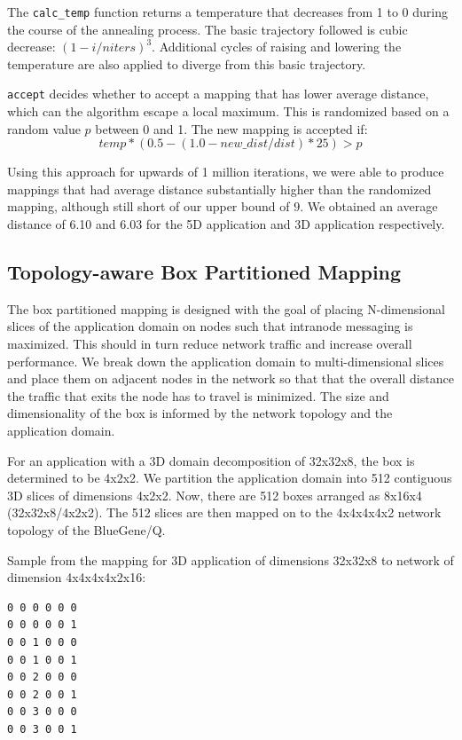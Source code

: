 \documentclass{acm_proc_article-sp}
\begin{document}
The \texttt{calc\_temp} function returns a temperature that
decreases from 1 to 0 during the course of the annealing process.
The basic trajectory followed is cubic decrease: $(1 - i/niters)^3$.
Additional cycles of raising and lowering the temperature are also
applied to diverge from this basic trajectory.

\texttt{accept} decides whether to accept a mapping that has lower
average distance, which can the algorithm escape a local maximum.
This is randomized based on a random value $p$ between 0 and 1.
The new mapping is accepted if:
$$temp * (0.5 - (1.0 - new\_dist/dist) * 25) > p$$

Using this approach for upwards of 1 million iterations,
we were able to produce mappings that had average distance substantially
higher than the randomized mapping, although still short of our upper
bound of $9$.  We obtained an average distance of 6.10 and 6.03 for the 5D application and
3D application respectively.

\subsection{Topology-aware Box Partitioned Mapping}

The box partitioned mapping is designed with the goal of placing N-dimensional slices of the application domain on nodes such that
intranode messaging is maximized. This should in turn reduce network traffic and increase overall performance.
We break down the application domain to multi-dimensional slices and place them on adjacent nodes in the network so that that the
overall distance the traffic that exits the node has to travel is minimized. The size and dimensionality of the box is informed
by the network topology and the application domain.

For an application with a 3D domain decomposition of 32x32x8, the box is determined to be 4x2x2. We partition the application domain
into 512 contiguous 3D slices of dimensions 4x2x2. Now, there are 512 boxes arranged as 8x16x4 (32x32x8/4x2x2).
The 512 slices are then mapped on to the 4x4x4x4x2 network topology of the BlueGene/Q.

Sample from the mapping for 3D application of dimensions 32x32x8 to network of dimension 4x4x4x4x2x16:
\begin{lstlisting}[frame=lines, basicstyle=\ttfamily,columns=fixed]
0 0 0 0 0 0
0 0 0 0 0 1
0 0 1 0 0 0
0 0 1 0 0 1
0 0 2 0 0 0
0 0 2 0 0 1
0 0 3 0 0 0
0 0 3 0 0 1
\end{lstlisting}
\end{document}
